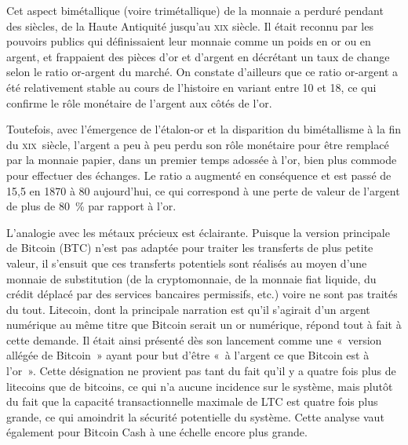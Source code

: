 Cet aspect bimétallique (voire trimétallique) de la monnaie a perduré pendant des siècles, de la Haute Antiquité jusqu'au \textsc{xix}\ieme{} siècle. Il était reconnu par les pouvoirs publics qui définissaient leur monnaie comme un poids en or ou en argent, et frappaient des pièces d'or et d'argent en décrétant un taux de change selon le ratio or-argent du marché. On constate d'ailleurs que ce ratio or-argent a été relativement stable au cours de l'histoire en variant entre 10 et 18, ce qui confirme le rôle monétaire de l'argent aux côtés de l'or.

Toutefois, avec l'émergence de l'étalon-or et la disparition du bimétallisme à la fin du \textsc{xix}\ieme{}~siècle, l'argent a peu à peu perdu son rôle monétaire pour être remplacé par la monnaie papier, dans un premier temps adossée à l'or, bien plus commode pour effectuer des échanges. Le ratio a augmenté en conséquence et est passé de 15,5 en 1870 à 80 aujourd'hui, ce qui correspond à une perte de valeur de l'argent de plus de 80~\% par rapport à l'or.

L'analogie avec les métaux précieux est éclairante. Puisque la version principale de Bitcoin (BTC) n'est pas adaptée pour traiter les transferts de plus petite valeur, il s'ensuit que ces transferts potentiels sont réalisés au moyen d'une monnaie de substitution (de la cryptomonnaie, de la monnaie fiat liquide, du crédit déplacé par des services bancaires permissifs, etc.) voire ne sont pas traités du tout. Litecoin, dont la principale narration est qu'il s'agirait d'un argent numérique au même titre que Bitcoin serait un or numérique, répond tout à fait à cette demande. Il était ainsi présenté dès son lancement comme une «~version allégée de Bitcoin~» ayant pour but d'être «~à l'argent ce que Bitcoin est à l'or~». Cette désignation ne provient pas tant du fait qu'il y a quatre fois plus de litecoins que de bitcoins, ce qui n'a aucune incidence sur le système, mais plutôt du fait que la capacité transactionnelle maximale de LTC est quatre fois plus grande, ce qui amoindrit la sécurité potentielle du système. Cette analyse vaut également pour Bitcoin Cash à une échelle encore plus grande.

